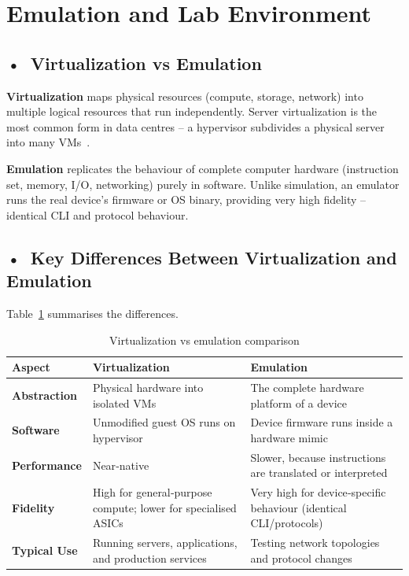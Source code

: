\section{Emulation and Lab Environment}

\subsection*{\mbox{•}~Virtualization vs Emulation}
\textbf{Virtualization} maps physical resources (compute, storage, network) into multiple logical resources that run independently. Server virtualization is the most common form in data centres – a hypervisor subdivides a physical server into many VMs~\cite{IBM_Virtualization}.

\textbf{Emulation} replicates the behaviour of complete computer hardware (instruction set, memory, I/O, networking) purely in software. Unlike simulation, an emulator runs the real device’s firmware or OS binary, providing very high fidelity – identical CLI and protocol behaviour.

\subsection*{\mbox{•}~Key Differences Between Virtualization and Emulation}
Table~\ref{tab:virtualization-emulation} summarises the differences.

\begin{table}[!htbp]
\centering
\small
\begin{tabularx}{\textwidth}{|p{2.8cm}|X|X|}
\hline
\textbf{Aspect} & \textbf{Virtualization} & \textbf{Emulation} \\ \hline
\textbf{Abstraction} & Physical hardware into isolated VMs & The complete hardware platform of a device \\ \hline
\textbf{Software} & Unmodified guest OS runs on hypervisor & Device firmware runs inside a hardware mimic \\ \hline
\textbf{Performance} & Near‑native & Slower, because instructions are translated or interpreted \\ \hline
\textbf{Fidelity} & High for general‑purpose compute; lower for specialised ASICs & Very high for device‑specific behaviour (identical CLI/protocols) \\ \hline
\textbf{Typical Use} & Running servers, applications, and production services & Testing network topologies and protocol changes \\ \hline
\end{tabularx}
\caption{Virtualization vs emulation comparison}
\label{tab:virtualization-emulation}
\end{table}

